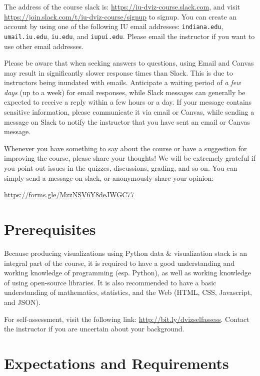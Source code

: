 \documentclass[11pt,article,oneside]{memoir} %
\begin{document}
The address of the course slack is: \url{https://iu-dviz-course.slack.com}, and visit \url{https://join.slack.com/t/iu-dviz-course/signup} to signup.
You can create an account by using one of the following IU email addresses: \texttt{indiana.edu}, \texttt{umail.iu.edu}, \texttt{iu.edu}, and \texttt{iupui.edu}. Please email the instructor if you want to use other email addresses. 

Please be aware that when seeking answers to questions, using Email and Canvas may result in significantly slower response times than Slack. This is due to instructors being inundated with emails. Anticipate a waiting period of \emph{a few days} (up to a week) for email responses, while Slack messages can generally be expected to receive a reply within a few hours or a day. If your message contains sensitive information, please communicate it via email or Canvas, while sending a message on Slack to notify the instructor that you have sent an email or Canvas message.

Whenever you have something to say about the course or have a suggestion for improving the course, please share your thoughts! We will be extremely grateful if you point out issues in the quizzes, discussions, grading, and so on. You can simply send a message on slack, or anonymously share your opinion:

\url{https://forms.gle/MzzNSV6Y8deJWGC77} 

\section{Prerequisites}%
\label{sec:Prerequisites}

Because producing visualizations using Python data \& visualization stack is an integral part of the course, it is required to have a good understanding and working knowledge of programming (esp. Python), as well as working knowledge of using open-source libraries. 
It is also recommended to have a basic understanding of mathematics, statistics, and the Web (HTML, CSS, Javascript, and JSON). 

For self-assessment, visit the following link: \href{http://bit.ly/dvizselfassess}{http://bit.ly/dvizselfassess}. 
Contact the instructor if you are uncertain about your background. 

\section{Expectations and Requirements}%
\label{sec:requirements}
\end{document}
